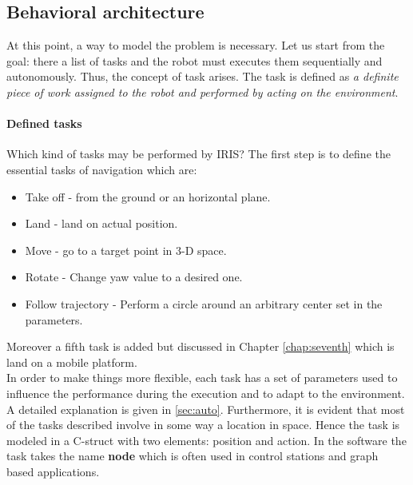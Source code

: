 \subsection{Behavioral architecture}
\label{sec:behav}
At this point, a way to model the problem is necessary. Let us start from the goal: there a list of tasks and the robot must executes them sequentially and autonomously. Thus, the concept of task arises. The task is defined as \textit{a definite piece of work assigned to the robot and performed by acting on the environment}. 

\paragraph{Defined tasks} Which kind of tasks may be performed by IRIS? The first step is to define the essential tasks of navigation which are:
\begin{itemize}
\item Take off - from the ground or an horizontal plane.
\item Land - land on actual position.
\item Move - go to a target point in 3-D space.
\item Rotate - Change yaw value to a desired one.
\item Follow trajectory - Perform a circle around an arbitrary center set in the parameters.
\end{itemize}
Moreover a fifth task is added but discussed in Chapter \ref{chap:seventh} which is land on a mobile platform. \newline \\
In order to make things more flexible, each task has a set of parameters used to influence the performance during the execution and to adapt to the environment. A detailed explanation is given in \ref{sec:auto}. Furthermore, it is evident that most of the tasks described involve in some way a location in space. Hence the task is modeled in a C-struct with two elements: position and action. In the software the task takes the name \textbf{node} which is often used in control stations and graph based applications.

